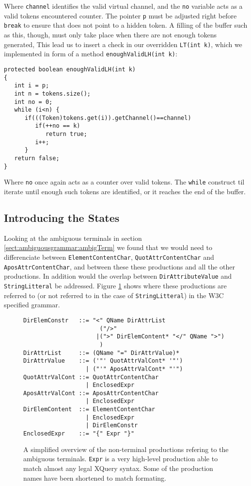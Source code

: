Where \verb!channel! identifies the valid virtual channel, and the \verb!no! variable acts as a valid tokens encountered counter. The pointer \verb!p! must be adjusted right before \verb!break! to ensure that does not point to a hidden token. A filling of the buffer such as this, though, must only take place when there are not enough tokens generated, This lead us to insert a check in our overridden \verb!LT(int k)!, which we implemented in form of a method \verb!enoughValidLH(int k)!:
\begin{verbatim}
protected boolean enoughValidLH(int k)
{
   int i = p;
   int n = tokens.size();
   int no = 0;
   while (i<n) {
      if(((Token)tokens.get(i)).getChannel()==channel)
         if(++no == k)
            return true;
         i++;
      }
   return false;
}
\end{verbatim}
Where \verb!no! once again acts as a counter over valid tokens. The \verb!while! construct til iterate until enough such tokens are identified, or it reaches the end of the buffer.

\subsection{Introducing the States}
\label{sect:rewriteGrammar:introduceStates}
Looking at the ambiguous terminals in section \ref{sect:ambiguousgrammar:ambigTerm} we found that we would need to differenciate between \verb!ElementContentChar!, \verb!QuotAttrContentChar! and \verb!AposAttrContentChar!, and between these these productions and all the other productions. In addition would the overlap between \verb!DirAttributeValue! and \verb!StringLitteral! be addressed. Figure \ref{fig:ambigTerminalRef} shows where these productions are referred to (or not referred to in the case of \verb!StringLitteral!) in the W3C specified grammar. 
\begin{figure}[h!]
\begin{verbatim}
DirElemConstr   ::= "<" QName DirAttrList 
                      ("/>" 
                     |(">" DirElemContent* "</" QName ">")
                      )
DirAttrList     ::= (QName "=" DirAttrValue)*
DirAttrValue    ::= ('"' QuotAttrValCont* '"')
                  | ("'" AposAttrValCont* "'")
QuotAttrValCont ::= QuotAttrContentChar
                  | EnclosedExpr
AposAttrValCont ::= AposAttrContentChar
                  | EnclosedExpr
DirElemContent  ::= ElementContentChar
                  | EnclosedExpr
                  | DirElemConstr
EnclosedExpr    ::= "{" Expr "}"
\end{verbatim}
\caption[Grammar reffering to amiguous terminals.]{A simplified overview of the non-terminal productions refering to the ambiguous terminals. \texttt{Expr} is a very high-level production able to match almost any legal XQuery syntax. Some of the production names have been shortened to match formating.}
\label{fig:ambigTerminalRef}
\end{figure}

